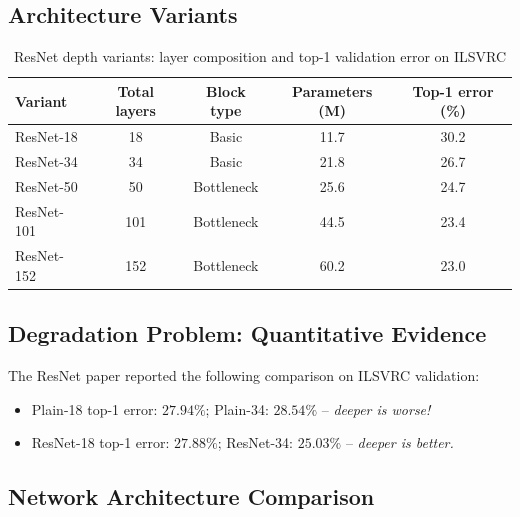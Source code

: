 \documentclass[12pt,a4paper]{article}
\begin{document}
\subsection{Architecture Variants}

\begin{table}[ht]
\centering
\caption{ResNet depth variants: layer composition and top-1 validation error on ILSVRC}
\label{tab:resnet_variants}
\begin{tabular}{@{}lcccc@{}}
\toprule
Variant & Total layers & Block type & Parameters (M) & Top-1 error (\%) \\
\midrule
ResNet-18  & 18  & Basic      & 11.7  & 30.2 \\
ResNet-34  & 34  & Basic      & 21.8  & 26.7 \\
ResNet-50  & 50  & Bottleneck & 25.6  & 24.7 \\
ResNet-101 & 101 & Bottleneck & 44.5  & 23.4 \\
ResNet-152 & 152 & Bottleneck & 60.2  & 23.0 \\
\bottomrule
\end{tabular}
\end{table}

\subsection{Degradation Problem: Quantitative Evidence}

The ResNet paper reported the following comparison on ILSVRC validation:
\begin{itemize}[leftmargin=2em]
  \item Plain-18 top-1 error: $27.94\%$; Plain-34: $28.54\%$ -- \emph{deeper is worse!}
  \item ResNet-18 top-1 error: $27.88\%$; ResNet-34: $25.03\%$ -- \emph{deeper is better.}
\end{itemize}

\subsection{Network Architecture Comparison}
\end{document}
